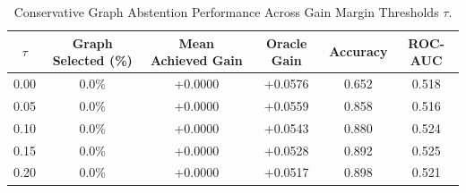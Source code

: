 \begin{table}[t]
\centering
\small
\caption{Conservative Graph Abstention Performance Across Gain Margin Thresholds $\tau$.}
\label{tab:conservative_abstention}
\begin{tabular}{cccccc}
\toprule
\textbf{$\tau$} & \textbf{Graph Selected (\%)} & \textbf{Mean Achieved Gain} & \textbf{Oracle Gain} & \textbf{Accuracy} & \textbf{ROC-AUC} \\
\midrule
0.00 &   0.0\% & +0.0000 & +0.0576 & 0.652 & 0.518 \\
0.05 &   0.0\% & +0.0000 & +0.0559 & 0.858 & 0.516 \\
0.10 &   0.0\% & +0.0000 & +0.0543 & 0.880 & 0.524 \\
0.15 &   0.0\% & +0.0000 & +0.0528 & 0.892 & 0.525 \\
0.20 &   0.0\% & +0.0000 & +0.0517 & 0.898 & 0.521 \\
\bottomrule
\end{tabular}
\end{table}